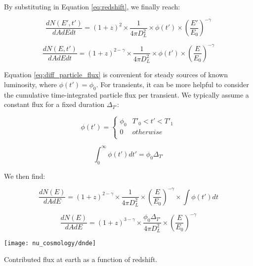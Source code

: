 By substituting in Equation \ref{eq:redshift}, we finally reach:

\begin{equation}
\frac{dN(E', t')}{dAdEdt}= (1+z)^{2} \times \frac{1}{4 \pi D_{L}^{2}} \times \phi(t') \times \left( \frac{E'}{E_{0}}\right) ^{-\gamma}
\end{equation}

 \begin{equation}
 \frac{dN(E, t')}{dAdEdt}= (1+z)^{2 - \gamma} \times \frac{1}{4 \pi D_{L}^{2}} \times \phi(t') \times \left( \frac{E}{E_{0}}\right) ^{-\gamma}
 \label{eq:diff_particle_flux}
 \end{equation}
 
Equation \ref{eq:diff_particle_flux} is convenient for steady sources of known luminosity, where $\phi(t') = \phi_{0}$. For transients, it can be more helpful to consider the cumulative time-integrated particle flux per transient. We typically assume a constant flux for a fixed duration $\Delta_{T'}$:

 \begin{equation}
\phi(t')  = 
\begin{cases}
\phi_{0} & T'_{0} < t' < T'_{1}\\
0 & otherwise\\
\end{cases}
\end{equation}

\begin{equation}
\int_{0}^{\infty} \phi(t') dt' = \phi_{0} \Delta_{T'}
\end{equation}

We then find:

 \begin{equation}
 \frac{dN(E)}{dAdE} = (1+z)^{2 - \gamma} \times \frac{1}{4 \pi D_{L}^{2}}  \times \left( \frac{E}{E_{0}}\right) ^{-\gamma} \times \int \phi(t') dt 
\end{equation}

 \begin{equation}
\frac{dN(E)}{dAdE}= (1+z)^{3 - \gamma} \times \frac{\phi_{0} \Delta_{T'}}{4 \pi D_{L}^{2}} \times \left( \frac{E}{E_{0}}\right) ^{-\gamma}
\end{equation}
 
\begin{marginfigure}
	\centering \texttt{[image: nu\_cosmology/dnde]}
	\caption{Contributed flux at earth as a function of redshift.}
	\label{fig:dnde}
\end{marginfigure}

